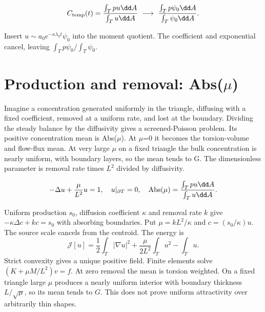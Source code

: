 \documentclass[11pt,oneside,openany]{book}
\begin{document}
\[C_{\rm temp}(t)=\frac{\int_Tpu\dd A}{\int_Tu\dd A}\ \longrightarrow\ \frac{\int_Tp\psi_0\dd A}{\int_T\psi_0\dd A}.\]


Insert $u\sim a_0e^{-\kappa\lambda_0t}\psi_0$ into the moment
quotient. The coefficient and exponential cancel, leaving
$\int_Tp\psi_0/\int_T\psi_0$.



\section{Production and removal: Abs(\ensuremath{\mu})}\label{sec:slide68}

Imagine a concentration generated uniformly in the triangle, diffusing with a fixed coefficient, removed at a uniform rate, and lost at the boundary. Dividing the steady balance by the diffusivity gives a screened-Poisson problem. Its positive concentration mean is Abs(\ensuremath{\mu}). At \ensuremath{\mu}=0 it becomes the torsion-volume and flow-flux mean. At very large \ensuremath{\mu} on a fixed triangle the bulk concentration is nearly uniform, with boundary layers, so the mean tends to G. The dimensionless parameter is removal rate times $L^2$ divided by diffusivity.


\[-\Delta u+\frac{\mu}{L^2}u=1,\quad u|_{\partial T}=0,\quad {\rm Abs}(\mu)=\frac{\int_Tpu\dd A}{\int_Tu\dd A}.\]



Uniform production $s_0$, diffusion coefficient $\kappa$ and removal
rate $k$ give $-\kappa\Delta c+kc=s_0$ with absorbing boundaries.
Put $\mu=kL^2/\kappa$ and $c=(s_0/\kappa)u$.
The source scale cancels from the centroid.
The energy is
\[
\mathcal J[u]=\frac12\int_T|\nabla u|^2
+\frac{\mu}{2L^2}\int_Tu^2-\int_Tu.
\]
Strict convexity gives a unique positive field.
Finite elements solve $(K+\mu M/L^2)v=f$.
At zero removal the mean is torsion weighted.
On a fixed triangle large $\mu$ produces a nearly uniform interior
with boundary thickness $L/\sqrt\mu$, so its mean tends to $G$.
This does not prove uniform attractivity over arbitrarily thin shapes.
\end{document}
